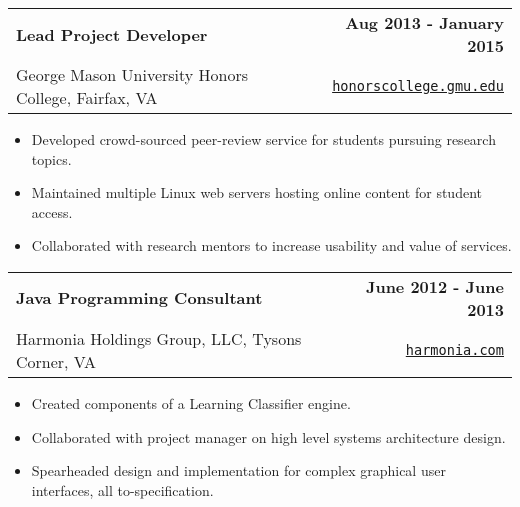 \documentclass[letterpaper]{article}
\newenvironment{details}
{\begin{itemize}}
{\end{itemize}}
\begin{document}
  \noindent
  \begin{tabularx}{\textwidth}{@{}X r@{}}
    \textbf{Lead Project Developer} & \textbf{Aug 2013 - January 2015} \\
    George Mason University Honors College, Fairfax, VA & \texttt{\href{http://honorscollege.gmu.edu/collegeresearch}{honorscollege.gmu.edu}}
  \end{tabularx}

  \begin{details}
  \item Developed crowd-sourced peer-review service for students pursuing research topics.
  \item Maintained multiple Linux web servers hosting online content for student access.
  \item Collaborated with research mentors to increase usability and value of services.
  \end{details}

  \noindent
  \begin{tabularx}{\textwidth}{@{}X r@{}}
    \textbf{Java Programming Consultant} & \textbf{June 2012 - June 2013} \\
    Harmonia Holdings Group, LLC, Tysons Corner, VA & \texttt{\href{harmonia.com}{harmonia.com}}
  \end{tabularx}

  \begin{details}
  \item Created components of a Learning Classifier engine.
  \item Collaborated with project manager on high level systems architecture design.
  \item Spearheaded design and implementation for complex graphical user interfaces, all to-specification.
  \end{details}

%
\end{document}
